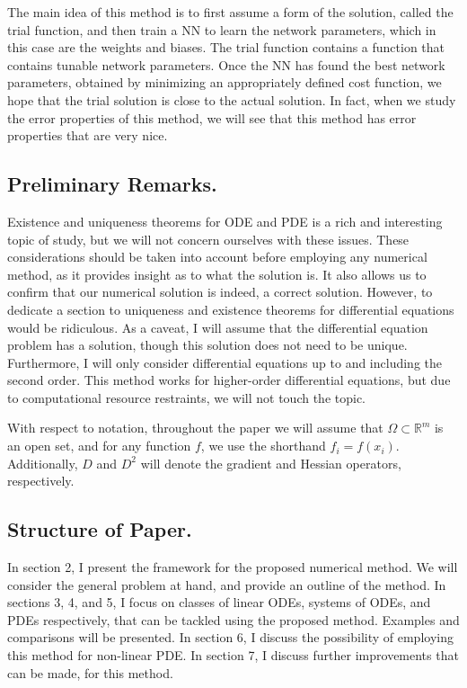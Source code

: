 \documentclass[10pt]{article}
\theoremstyle{plain}
\theoremstyle{definition}
\theoremstyle{remark}
\numberwithin{theorem}{section}
\numberwithin{proposition}{section}
\numberwithin{remark}{section}
\numberwithin{corollary}{section}
\numberwithin{definition}{section}
\numberwithin{lemma}{section}
\numberwithin{equation}{section}
\begin{document}
The main idea of this method is to first assume a form of the solution, called the trial function, and then train a NN to learn the network parameters, which in this case are the weights and biases. The trial function contains a function that contains tunable network parameters. Once the NN has found the best network parameters, obtained by minimizing an appropriately defined cost function, we hope that the trial solution is close to the actual solution. In fact, when we study the error properties of this method, we will see that this method has error properties that are very nice. 
\subsection{Preliminary Remarks.}
Existence and uniqueness theorems for ODE and PDE is a rich and interesting topic of study, but we will not concern ourselves with these issues. These considerations should be taken into account before employing any numerical method, as it provides insight as to what the solution is. It also allows us to confirm that our numerical solution is indeed, a correct solution. However, to dedicate a section to uniqueness and existence theorems for differential equations would be ridiculous. As a caveat, I will assume that the differential equation problem has a solution, though this solution does not need to be unique. Furthermore, I will only consider differential equations up to and including the second order. This method works for higher-order differential equations, but due to computational resource restraints, we will not touch the topic. 

With respect to notation, throughout the paper we will assume that $\Omega \subset \mathbb{R}^m$ is an open set, and for any function $f$, we use the shorthand $f_i = f(x_i)$. Additionally, $D$ and $D^2$ will denote the gradient and Hessian operators, respectively. 
\subsection{Structure of Paper.}
In section 2, I present the framework for the proposed numerical method. We will consider the general problem at hand, and provide an outline of the method. In sections 3, 4, and 5, I focus on classes of linear ODEs, systems of ODEs, and PDEs respectively, that can be tackled using the proposed method. Examples and comparisons will be presented. In section 6, I discuss the possibility of employing this method for non-linear PDE. In section 7, I discuss further improvements that can be made, for this method. 
\end{document}
